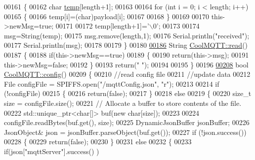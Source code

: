 \begin{DoxyCode}
00161 \{
00162     \textcolor{keywordtype}{char} \hyperlink{_irene3000_8h_a5905d48604152cf57aa6bfa087b49173}{temp}[length+1];
00163 
00164     \textcolor{keywordflow}{for} (\textcolor{keywordtype}{int} i = 0; i < length; i++) 
00165     \{
00166         temp[i]=(char)payload[i]; 
00167 
00168     \}
00169 
00170     this->newMsg=\textcolor{keyword}{true};
00171 
00172     temp[length+1]=\textcolor{charliteral}{'\(\backslash\)0'};
00173 
00174     msg=String(temp);
00175     msg.remove(length,1);
00176     Serial.println(\textcolor{stringliteral}{"received"});
00177     Serial.println(msg);
00178 
00179 \}
00180 
\hyperlink{class_cool_m_q_t_t_ae3c18f6ae9723746d32765f1c8f176ca}{00186} String \hyperlink{class_cool_m_q_t_t_ae3c18f6ae9723746d32765f1c8f176ca}{CoolMQTT::read}()
00187 \{   
00188     \textcolor{keywordflow}{if}(this->newMsg==\textcolor{keyword}{true})
00189     \{
00190         \textcolor{keywordflow}{return}(this->msg);
00191         this->newMsg=\textcolor{keyword}{false};
00192     \}
00193     \textcolor{keywordflow}{return}(\textcolor{stringliteral}{" "});
00194 
00195 \}
00196 
\hyperlink{class_cool_m_q_t_t_a6571671781a505feca9a8a56e256c6bc}{00208} \textcolor{keywordtype}{bool} \hyperlink{class_cool_m_q_t_t_a6571671781a505feca9a8a56e256c6bc}{CoolMQTT::config}()
00209 \{
00210     \textcolor{comment}{//read config file}
00211     \textcolor{comment}{//update data}
00212     File configFile = SPIFFS.open(\textcolor{stringliteral}{"/mqttConfig.json"}, \textcolor{stringliteral}{"r"});
00213 
00214     \textcolor{keywordflow}{if} (!configFile) 
00215     \{
00216         \textcolor{keywordflow}{return}(\textcolor{keyword}{false});
00217     \}
00218     \textcolor{keywordflow}{else}
00219     \{
00220         \textcolor{keywordtype}{size\_t} size = configFile.size();
00221         \textcolor{comment}{// Allocate a buffer to store contents of the file.}
00222         std::unique\_ptr<char[]> buf(\textcolor{keyword}{new} \textcolor{keywordtype}{char}[size]);
00223 
00224         configFile.readBytes(buf.get(), size);
00225         DynamicJsonBuffer jsonBuffer;
00226         JsonObject& json = jsonBuffer.parseObject(buf.get());
00227         \textcolor{keywordflow}{if} (!json.success()) 
00228         \{
00229               \textcolor{keywordflow}{return}(\textcolor{keyword}{false});
00230         \} 
00231         \textcolor{keywordflow}{else}
00232         \{               
00233                 \textcolor{keywordflow}{if}(json[\textcolor{stringliteral}{"mqttServer"}].success() )

\end{DoxyCode}
